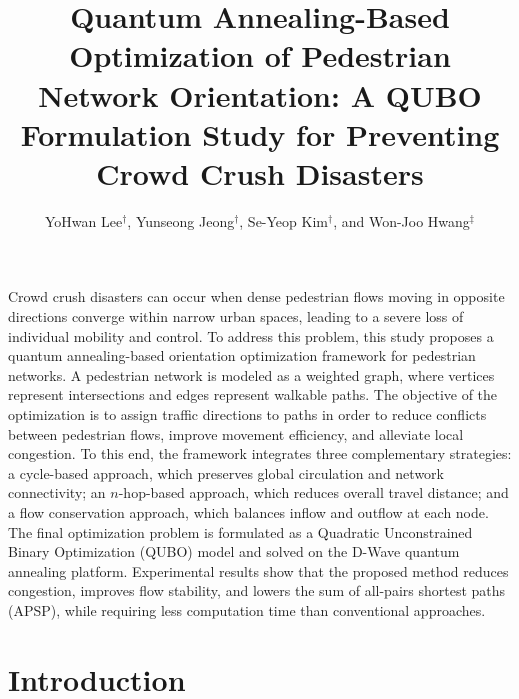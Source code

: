 \documentclass[twocolumn,a4paper]{article}
\begin{document}
\title{Quantum Annealing-Based Optimization of
Pedestrian Network Orientation:
A QUBO Formulation Study for Preventing Crowd
Crush Disasters}
\author{YoHwan Lee${}^\dag$, Yunseong Jeong${}^\dag$, Se-Yeop Kim${}^\dag$, and Won-Joo Hwang${}^\ddag$}
\address{\dag School of Computer Science and Engineering, Pusan National University \\
\ddag Department of Information Convergence Engineering, Pusan National University \\
Busan 46241, Republic of Korea \\
Email: , , , }
\maketitle

\abstract
Crowd crush disasters can occur when dense pedestrian flows moving in opposite directions converge within narrow urban spaces, leading to a severe loss of individual mobility and control. To address this problem, this study proposes a quantum annealing-based orientation optimization framework for pedestrian networks. A pedestrian network is modeled as a weighted graph, where vertices represent intersections and edges represent walkable paths. The objective of the optimization is to assign traffic directions to paths in order to reduce conflicts between pedestrian flows, improve movement efficiency, and alleviate local congestion. To this end, the framework integrates three complementary strategies: a cycle-based approach, which preserves global circulation and network connectivity; an $n$-hop-based approach, which reduces overall travel distance; and a flow conservation approach, which balances inflow and outflow at each node. The final optimization problem is formulated as a Quadratic Unconstrained Binary Optimization (QUBO) model and solved on the D-Wave quantum annealing platform. Experimental results show that the proposed method reduces congestion, improves flow stability, and lowers the sum of all-pairs shortest paths (APSP), while requiring less computation time than conventional approaches.
\endabstract

\section{Introduction} \label{sec:intro}
\end{document}
